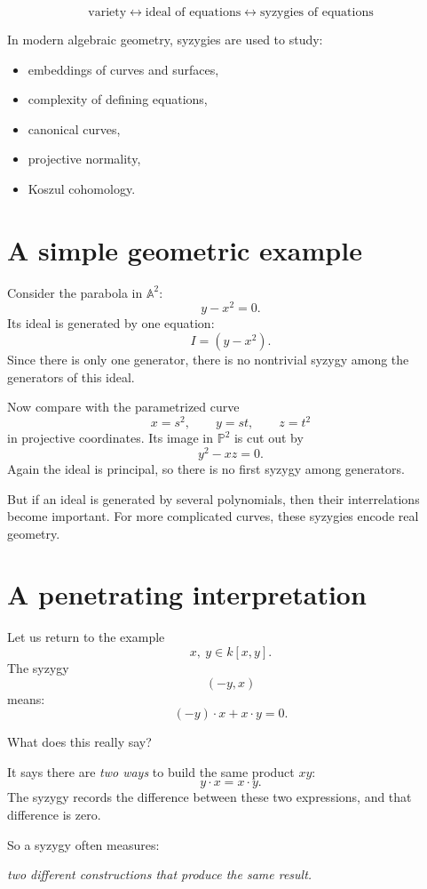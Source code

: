 \documentclass[11pt]{article}
\theoremstyle{definition}
\theoremstyle{remark}
\newcommand{\A}{\mathbb{A}}
\newcommand{\PP}{\mathbb{P}}
\begin{document}
	\[
	\text{variety} \longleftrightarrow \text{ideal of equations} \longleftrightarrow \text{syzygies of equations}
	\]
	
	In modern algebraic geometry, syzygies are used to study:
	\begin{itemize}[leftmargin=2em]
		\item embeddings of curves and surfaces,
		\item complexity of defining equations,
		\item canonical curves,
		\item projective normality,
		\item Koszul cohomology.
	\end{itemize}
	
	\section{A simple geometric example}
	
	Consider the parabola in \(\A^2\):
	\[
	y-x^2=0.
	\]
	Its ideal is generated by one equation:
	\[
	I=(y-x^2).
	\]
	Since there is only one generator, there is no nontrivial syzygy among the generators of this ideal.
	
	Now compare with the parametrized curve
	\[
	x=s^2,\qquad y=st,\qquad z=t^2
	\]
	in projective coordinates. Its image in \(\PP^2\) is cut out by
	\[
	y^2-xz=0.
	\]
	Again the ideal is principal, so there is no first syzygy among generators.
	
	But if an ideal is generated by several polynomials, then their interrelations become important. For more complicated curves, these syzygies encode real geometry.
	
	\section{A penetrating interpretation}
	
	Let us return to the example
	\[
	x,\ y \in k[x,y].
	\]
	The syzygy
	\[
	(-y,x)
	\]
	means:
	\[
	(-y)\cdot x + x\cdot y = 0.
	\]
	
	What does this really say?
	
	It says there are \emph{two ways} to build the same product \(xy\):
	\[
	y\cdot x = x\cdot y.
	\]
	The syzygy records the difference between these two expressions, and that difference is zero.
	
	So a syzygy often measures:
	\begin{center}
		\emph{two different constructions that produce the same result.}
	\end{center}
	
\end{document}
